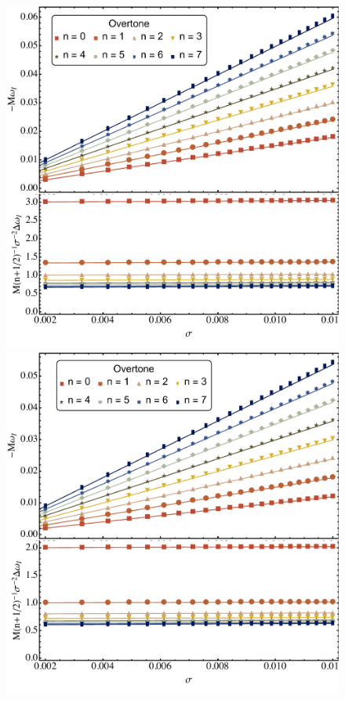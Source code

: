 \begin{refsection}
\begin{figure}[tb]
\includegraphics[width =1.0 \columnwidth]{chapter_extremal/etc/Quads1L1.pdf}
\includegraphics[width =1.0 \columnwidth]{chapter_extremal/etc/Quads2L2.pdf} \\

\end{figure}
\end{refsection}
